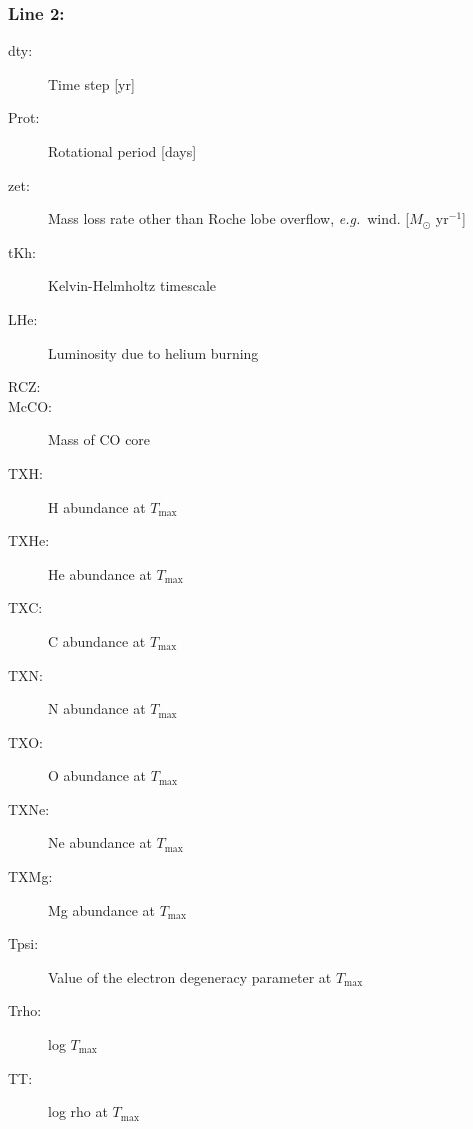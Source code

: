 \subsubsection*{Line 2:}
\begin{description}
\item[dty:] Time step [yr]
\item[Prot:] Rotational period [days]
\item[zet:] Mass loss rate other than Roche lobe overflow, \emph{e.g.}\ wind. [$M_\odot$ yr$^{-1}$]
\item[tKh:] Kelvin-Helmholtz timescale
\item[LHe:] Luminosity due to helium burning
\item[RCZ:]
\item[McCO:] Mass of CO core
\item[TXH:] H abundance at $T_\mathrm{max}$
\item[TXHe:] He abundance at $T_\mathrm{max}$
\item[TXC:] C abundance at $T_\mathrm{max}$
\item[TXN:] N abundance at $T_\mathrm{max}$
\item[TXO:] O abundance at $T_\mathrm{max}$
\item[TXNe:] Ne abundance at $T_\mathrm{max}$
\item[TXMg:] Mg abundance at $T_\mathrm{max}$
\item[Tpsi:] Value of the electron degeneracy parameter at $T_\mathrm{max}$
\item[Trho:] log $T_\mathrm{max}$
\item[TT:] log rho at $T_\mathrm{max}$
\end{description}



